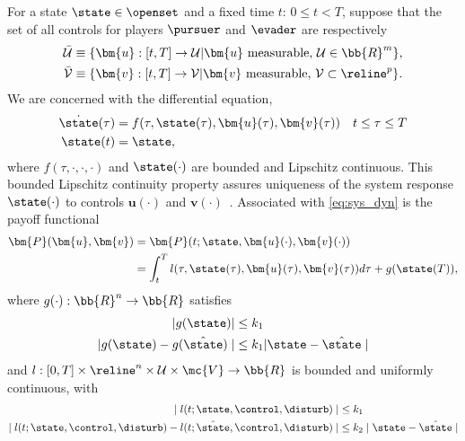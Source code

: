 For a state $\state \in \openset$ and a fixed time $t$: $0 \le t < T$, suppose that the set of all controls for players $\pursuer$ and $\evader$ are respectively
%
\begin{align}
	\mathcal{\bar{U}} &\equiv \{\bm{u}: [t, T] \rightarrow \mathcal{U} | \bm{u} \text{ measurable}, \, \mathcal{U} \in \bb{R}^m \}, \\
	\mathcal{\bar{V}} &\equiv \{\bm{v}: [t, T] \rightarrow \mathcal{V} | \bm{v} \text{ measurable},  \,\mathcal{V} \subset \reline^p\}.
\end{align}
%
\noindent We are concerned with the  differential equation,
%
\begin{subequations}
	\begin{align}
		\dot{\state}(\tau) &= f(\tau, \state(\tau), \bm{u}(\tau), \bm{v}(\tau)) \quad t \le \tau \le T \\
		\state(t) &= \state,
	\end{align}
	\label{eq:sys_dyn}
\end{subequations}
%
\noindent where $f(\tau, \cdot, \cdot, \cdot)$ and $\state(\cdot)$ are bounded and Lipschitz continuous. This bounded Lipschitz continuity property assures uniqueness of the system response $\state(\cdot)$ to controls $\bm{u}(\cdot)$ and $\bm{v}(\cdot)$~\cite{Souganidis}. %
%
Associated with \eqref{eq:sys_dyn} is the payoff functional %
%
\begin{align}
	\bm{P}(\bm{u}, \bm{v}) &=	\bm{P}(t; \state, \bm{u}(\cdot), \bm{v}(\cdot)) \nonumber \\
	&= \int_{t}^{T} l(\tau, \state(\tau), \bm{u}(\tau), \bm{v}(\tau)) d\tau + g(\state(T)),
	\label{eq:payoff}
\end{align}
%
where $g(\cdot): \bb{R}^n \rightarrow \bb{R}$ %
satisfies
%
\begin{subequations}
	\begin{align}
		| g(\state) | &\le k_1 \\
		| g(\state) - g(\hat{\state}) \mid &\le k_1 | \state - \hat{\state} \mid
	\end{align}
\end{subequations}
%
and $l:[0, T] \times  \reline^n \times \mathcal{U} \times \mc{V} \rightarrow \bb{R}$ is bounded and uniformly continuous, with
%
\begin{subequations}
	\begin{align}
		\mid l(t; \state, \control, \disturb) \mid &\le k_1 \\
		\mid l(t; \state, \control, \disturb)  -  l(t; \hat{\state}, \control, \disturb) \mid & \le k_2 \mid \state - \hat{\state} \mid
	\end{align}
\end{subequations}
